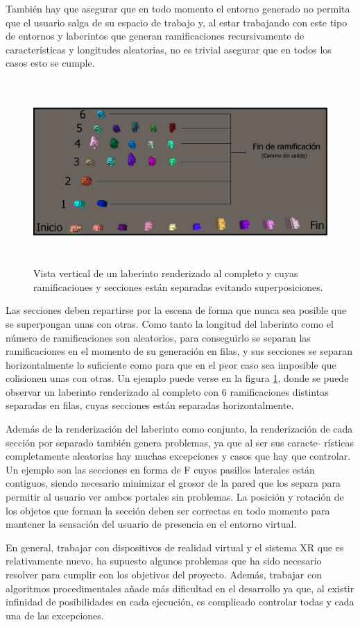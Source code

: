 \documentclass[../main.tex]{subfiles}
\begin{document}
También hay que asegurar que en todo momento el entorno generado no permita que el usuario salga de su espacio de trabajo y, al estar trabajando con este tipo de entornos y laberintos que generan ramificaciones recursivamente de características y longitudes aleatorias, no es trivial asegurar que en todos los casos esto se cumple.

\begin{figure}[h!]
\hspace{-1.25cm}
\includegraphics[width=14.5cm,height=7cm]{imagenes/Full_Maze.png}
\caption{Vista vertical de un laberinto renderizado al completo y cuyas ramificaciones y secciones están separadas evitando superposiciones.}
\label{fig:Full_Maze}
\end{figure}

Las secciones deben repartirse por la escena de forma que nunca sea posible que se superpongan unas con otras. Como tanto la longitud del laberinto como el número de ramificaciones son aleatorios, para conseguirlo se separan las ramificaciones en el momento de su generación en filas, y sus secciones se separan horizontalmente lo suficiente como para que en el peor caso sea imposible que colisionen unas con otras. Un ejemplo puede verse en la figura \ref{fig:Full_Maze}, donde se puede observar un laberinto renderizado al completo con 6 ramificaciones distintas separadas en filas, cuyas secciones están separadas horizontalmente.

Además de la renderización del laberinto como conjunto, la renderización de cada sección por separado también genera problemas, ya que al ser sus caracte- rísticas completamente aleatorias hay muchas excepciones y casos que hay que controlar. Un ejemplo son las secciones en forma de F cuyos pasillos laterales están contiguos, siendo necesario minimizar el grosor de la pared que los separa para permitir al usuario ver ambos portales sin problemas. La posición y rotación de los objetos que forman la sección deben ser correctas en todo momento para mantener la sensación del usuario de presencia en el entorno virtual.

En general, trabajar con dispositivos de realidad virtual y el sistema XR que es relativamente nuevo, ha supuesto algunos problemas que ha sido necesario resolver para cumplir con los objetivos del proyecto. Además, trabajar con algoritmos procedimentales añade más dificultad en el desarrollo ya que, al existir infinidad de posibilidades en cada ejecución, es complicado controlar todas y cada una de las excepciones.
\end{document}
